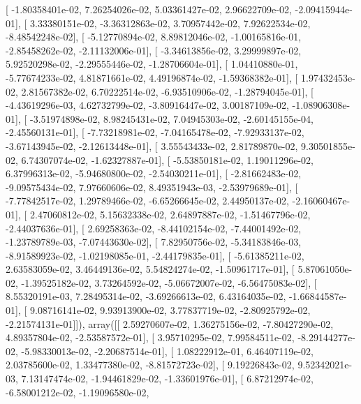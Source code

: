 \documentclass{article}
\begin{document}
       [ -1.80358401e-02,   7.26254026e-02,   5.03361427e-02,
          2.96622709e-02,  -2.09415944e-01],
       [  3.33380151e-02,  -3.36312863e-02,   3.70957442e-02,
          7.92622534e-02,  -8.48542248e-02],
       [ -5.12770894e-02,   8.89812046e-02,  -1.00165816e-01,
         -2.85458262e-02,  -2.11132006e-01],
       [ -3.34613856e-02,   3.29999897e-02,   5.92520298e-02,
         -2.29555446e-02,  -1.28706604e-01],
       [  1.04410880e-01,  -5.77674233e-02,   4.81871661e-02,
          4.49196874e-02,  -1.59368382e-01],
       [  1.97432453e-02,   2.81567382e-02,   6.70222514e-02,
         -6.93510906e-02,  -1.28794045e-01],
       [ -4.43619296e-03,   4.62732799e-02,  -3.80916447e-02,
          3.00187109e-02,  -1.08906308e-01],
       [ -3.51974898e-02,   8.98245431e-02,   7.04945303e-02,
         -2.60145155e-04,  -2.45560131e-01],
       [ -7.73218981e-02,  -7.04165478e-02,  -7.92933137e-02,
         -3.67143945e-02,  -2.12613448e-01],
       [  3.55543433e-02,   2.81789870e-02,   9.30501855e-02,
          6.74307074e-02,  -1.62327887e-01],
       [ -5.53850181e-02,   1.19011296e-02,   6.37996313e-02,
         -5.94680800e-02,  -2.54030211e-01],
       [ -2.81662483e-02,  -9.09575434e-02,   7.97660606e-02,
          8.49351943e-03,  -2.53979689e-01],
       [ -7.77842517e-02,   1.29789466e-02,  -6.65266645e-02,
          2.44950137e-02,  -2.16060467e-01],
       [  2.47060812e-02,   5.15632338e-02,   2.64897887e-02,
         -1.51467796e-02,  -2.44037636e-01],
       [  2.69258363e-02,  -8.44102154e-02,  -7.44001492e-02,
         -1.23789789e-03,  -7.07443630e-02],
       [  7.82950756e-02,  -5.34183846e-03,  -8.91589923e-02,
         -1.02198085e-01,  -2.44179835e-01],
       [ -5.61385211e-02,   2.63583059e-02,   3.46449136e-02,
          5.54824274e-02,  -1.50961717e-01],
       [  5.87061050e-02,  -1.39525182e-02,   3.73264592e-02,
         -5.06672007e-02,  -6.56475083e-02],
       [  8.55320191e-03,   7.28495314e-02,  -3.69266613e-02,
          6.43164035e-02,  -1.66844587e-01],
       [  9.08716141e-02,   9.93913900e-02,   3.77837719e-02,
         -2.80925792e-02,  -2.21574131e-01]]), array([[  2.59270607e-02,   1.36275156e-02,  -7.80427290e-02,
          4.89357804e-02,  -2.53587572e-01],
       [  3.95710295e-02,   7.99584511e-02,  -8.29144277e-02,
         -5.98330013e-02,  -2.20687514e-01],
       [  1.08222912e-01,   6.46407119e-02,   2.03785600e-02,
          1.33477380e-02,  -8.81572723e-02],
       [  9.19226843e-02,   9.52342021e-03,   7.13147474e-02,
         -1.94461829e-02,  -1.33601976e-01],
       [  6.87212974e-02,  -6.58001212e-02,  -1.19096580e-02,
\end{document}
